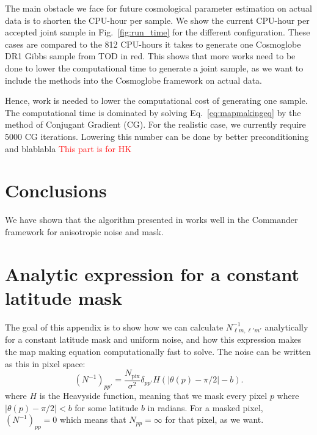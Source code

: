\documentclass[twocolumn]{../common/aa}
\begin{document}
The main obstacle we face for future cosmological parameter estimation on actual data is to shorten the CPU-hour per sample. We show the current CPU-hour per accepted joint sample in Fig.~\ref{fig:run_time} for the different configuration. These cases are compared to the 812 CPU-hours it takes to generate one Cosmoglobe DR1 Gibbs sample from TOD in red. This shows that more works need to be done to lower the computational time to generate a joint sample, as we want to include the methods into the Cosmoglobe framework on actual data.

Hence, work is needed to lower the computational cost of generating one sample. The computational time is dominated by solving Eq.~\eqref{eq:mapmakingeq} by the method of Conjugant Gradient (CG). For the realistic case, we currently require 5000 CG iterations. Lowering this number can be done by better preconditioning and blablabla \textcolor{red}{This part is for HK}

\section{Conclusions}
\label{sec:conclusions}

We have shown that the algorithm presented in \cite{racine:2016} works well in the Commander framework for anisotropic noise and mask.





\appendix

\section{Analytic expression for a constant latitude mask}
\label{sec:appendixA}


The goal of this appendix is to show how we can calculate $N_{\ell m, \ell' m'}^{-1}$ analytically for a constant latitude mask and uniform noise, and how this expression makes the map making equation computationally fast to solve. The noise can be written as this in pixel space:
$$
\left(N^{-1} \right)_{pp'} = \frac{N_{\mathrm{pix}}}{\sigma^2} \delta_{pp'} H(|\theta(p) -\pi/2|-b).
$$
where $H$ is the Heavyside function, meaning that we mask every pixel $p$ where $|\theta(p) -\pi/2| < b$ for some latitude $b$ in radians. For a masked pixel, $\left(N^{-1} \right)_{pp}=0$ which means that $N_{pp} = \infty$ for that pixel, as we want.
\end{document}
